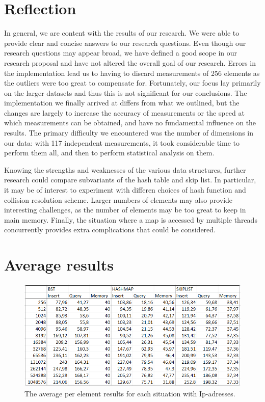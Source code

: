 \documentclass[12pt,a4paper]{article}
\begin{document}
    \section{Reflection}
    In general, we are content with the results of our research. We were able to provide clear and
    concise answers to our research questions. Even though our research questions may appear broad,
    we have defined a good scope in our research proposal and have not altered the overall goal
    of our research.  Errors in the implementation lead us to having to discard measurements of 256
    elements as the outliers were too great to compensate for.  Fortunately, our focus lay primarily
    on the larger datasets and thus this is not significant for our conclusions.  The implementation
    we finally arrived at differs from what we outlined, but the changes are largely to increase the
    accuracy of measurements or the speed at which measurements can be obtained, and have no
    fundamental influence on the results.  The primary difficulty we encountered was the number of
    dimensions in our data: with 117 independent measurements, it took considerable time to perform
    them all, and then to perform statistical analysis on them.

    Knowing the strengths and weaknesses of the various data structures, further research could
    compare subvariants of the hash table and skip list.  In particular, it may be of interest to
    experiment with differen choices of hash function and collision resolution scheme.  Larger
    numbers of elements may also provide interesting challenges, as the number of elements may be
    too great to keep in main memory.  Finally, the situation where a map is accessed by multiple
    threads concurrently provides extra complications that could be considered.

    

    

    \newpage
    \appendix
    \section{Average results} \label{App:AveResults}

    \begin{figure}[h!]
    \centering
    \includegraphics[width=\textwidth]{ip-address_averages.png}
    \caption{The average per element results for each situation with Ip-adresses.}
    \end{figure}
\end{document}
